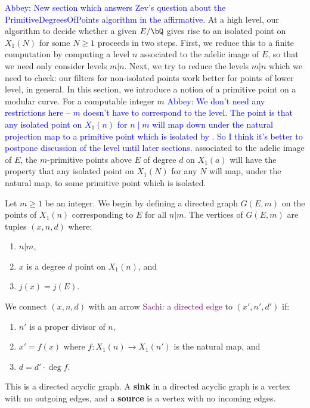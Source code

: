 \documentclass[11pt,reqno]{amsart}
\theoremstyle{plain}
\theoremstyle{definition}
\newcommand{\Q}{\bQ}
\newcommand{\abbey}[1]{\textcolor{blue}{Abbey: #1}}
\newcommand{\sachi}[1]{\textcolor{purple}{Sachi: #1}}
\newcommand{\abedit}[1]{{\color{blue} #1}}
\begin{document}
\abbey{New section which answers Zev's question about the PrimitiveDegreesOfPoints algorithm in the affirmative.}
At a high level, our algorithm to decide whether a given $E/\Q$ gives rise to an isolated point on $X_1(N)$ for some $N\geq 1$ proceeds in two steps. First, we reduce this to a finite computation by computing a level $n$ associated to the adelic image of $E$, so that we need only consider levels $m|n$. Next, we try to reduce the  levels $m|n$ which we need to check: our filters for non-isolated points work better for points of lower level, in general. In this section, we introduce a notion of a primitive point on a modular curve.
For a computable integer $m$ \abbey{We don't need any restrictions here -- $m$ doesn't have to correspond to the level. The point is that any isolated point on $X_1(n)$ for $n \mid m$ will map down under the natural projection map to a primitive point which is isolated by \cite[Theorem 4.3]{BELOV}. So I think it's better to postpone discussion of the level until later sections.} associated to the adelic image of $E$, the $m$-primitive points above $E$ of degree $d$ on $X_1(a)$ will have the property that any isolated point on $X_1(N)$ for any $N$ will map, under the natural map, to some primitive  point \abedit{which is isolated}.

Let $m\geq 1$ be an integer.
We begin by defining a directed graph $G(E,m)$ on the points of $X_1(n)$ corresponding to $E$ for all $n|m$. The vertices of $G(E,m)$ are tuples $(x,n,d)$ where:
\begin{enumerate}
    \item $n|m$,
    \item $x$ is a degree $d$ point on $X_1(n)$, and
    \item $j(x)=j(E)$.
\end{enumerate}
We connect $(x,n,d)$ with an arrow \sachi{a directed edge} to $(x',n',d')$ if:
\begin{enumerate}
    \item $n'$ is a proper divisor of $n$,
    \item $x'=f(x)$ where $f\colon X_1(n)\to X_1(n')$ is the natural map, and
    \item $d=d'\cdot \deg f$.
\end{enumerate}


This is a directed acyclic graph. A \textbf{sink} in a directed acyclic graph is a vertex with no outgoing edges, and a \textbf{source} is a vertex with no incoming edges.
\end{document}
